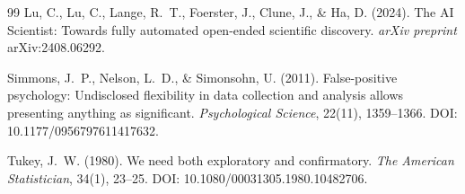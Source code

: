 \documentclass[11pt]{article}
\begin{document}
\begin{thebibliography}{99}
Lu, C., Lu, C., Lange, R.~T., Foerster, J., Clune, J., \& Ha, D. (2024).
\newblock The AI Scientist: Towards fully automated open-ended scientific
discovery.
\newblock \emph{arXiv preprint} arXiv:2408.06292.

Simmons, J.~P., Nelson, L.~D., \& Simonsohn, U. (2011).
\newblock False-positive psychology: Undisclosed flexibility in data
collection and analysis allows presenting anything as significant.
\newblock \emph{Psychological Science}, 22(11), 1359--1366.
\newblock DOI: 10.1177/0956797611417632.

Tukey, J.~W. (1980).
\newblock We need both exploratory and confirmatory.
\newblock \emph{The American Statistician}, 34(1), 23--25.
\newblock DOI: 10.1080/00031305.1980.10482706.

\end{thebibliography}
\end{document}

